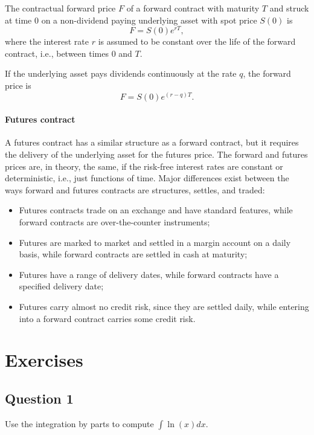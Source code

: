 The contractual forward price $ F $ of a forward contract with maturity $ T $
    and struck at time 0 on a non-dividend paying underlying asset with spot
    price $ S(0) $ is
\begin{equation*}
    F = S(0) e^{rT},
\end{equation*}
where the interest rate $ r $ is assumed to be constant over the life of the
    forward contract, i.e., between times 0 and $ T $.

If the underlying asset pays dividends continuously at the rate $ q $, the
    forward price is
\begin{equation*}
    F = S(0) e^{(r - q) T}.
\end{equation*}

\paragraph{Futures contract}
A futures contract has a similar structure as a forward contract, but it
    requires the delivery of the underlying asset for the futures price.
The forward and futures prices are, in theory, the same, if the risk-free
    interest rates are constant or deterministic, i.e., just functions of time.
Major differences exist between the ways forward and futures contracts are
    structures, settles, and traded:
\begin{itemize}
    \item Futures contracts trade on an exchange and have standard features,
        while forward contracts are over-the-counter instruments;
    \item Futures are marked to market and settled in a margin account on a
        daily basis, while forward contracts are settled in cash at maturity;
    \item Futures have a range of delivery dates, while forward contracts have
        a specified delivery date;
    \item Futures carry almost no credit risk, since they are settled daily,
        while entering into a forward contract carries some credit risk.
\end{itemize}

\section{Exercises}
\subsection{Question 1}
Use the integration by parts to compute $ \int \ln (x) dx $.

